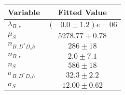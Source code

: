 \begin{tabular}[t]{lc}
\hline
Variable &Fitted Value\\
\hline\hline
$\lambda_{B,c}$&$(-0.0\pm1.2)e-06$\\
\hline
$\mu_S$&$5278.77\pm0.78$\\
\hline
$n_{B, D^* D_s h}$&$286\pm18$\\
\hline
$n_{B,c}$&$2.0\pm7.1$\\
\hline
$n_S$&$586\pm18$\\
\hline
$\sigma_{B, D^* D_s h}$&$32.3\pm2.2$\\
\hline
$\sigma_S$&$12.00\pm0.62$\\
\hline
\end{tabular}